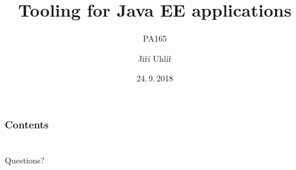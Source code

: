 \documentclass[pdf,compress]{beamer}
\title{Tooling for Java EE applications}
\subtitle{PA165}
\date{24.\,9.\,2018}
\author{Jiří Uhlíř}
\begin{document}
\frame{\titlepage}

\section[]{}
\begin{frame}
\frametitle{Contents}
\tableofcontents[hideallsubsections]
\end{frame}










\section*{}
\begin{frame}
\begin{center}
\Huge Questions?
\end{center}
\end{frame}
\end{document}
